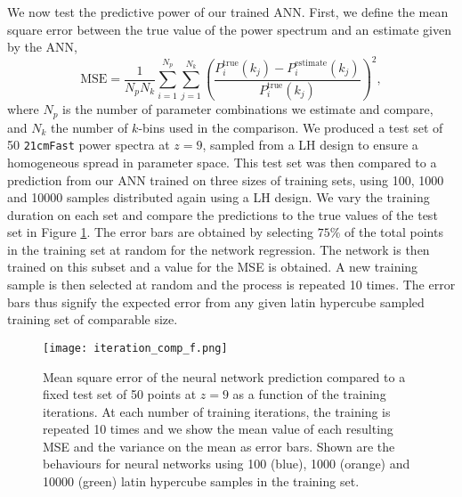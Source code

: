 \documentclass[useAMS,usenatbib]{mnras}
\begin{document}
We now test the predictive power of our trained ANN.
First, we define the mean square error between the true value of the power spectrum and an estimate given by the ANN,
\begin{equation}
\text{MSE} = \frac{1}{N_p N_k} \sum\limits_{i = 1}^{N_p}\sum\limits_{j = 1}^{N_k} \left(\frac{P^\text{true}_i(k_j) - P^\text{estimate}_i(k_j)}{P^\text{true}_i(k_j)}\right)^2,
\end{equation}
where $N_p$ is the number of parameter combinations we estimate and compare, and $N_k$ the number of $k$-bins used in the comparison.
We produced a test set of 50 \texttt{21cmFast} power spectra at $z = 9$, sampled from a LH design to ensure a homogeneous spread in parameter space. 
This test set was then compared to a prediction from our ANN trained on three sizes of training sets, using 100, 1000 and 10000 samples distributed again using a LH design.
We vary the training duration on each set and compare the predictions to the true values of the test set in Figure \ref{fig: training iter vs loss}.
The error bars are obtained by selecting $75\%$ of the total points in the training set at random for the network regression. 
The network is then trained on this subset and a value for the MSE is obtained.
A new training sample is then selected at random and the process is repeated 10 times. 
The error bars thus signify the expected error from any given latin hypercube sampled training set of comparable size. 
\begin{figure}
\texttt{[image: iteration\_comp\_f.png]}
\caption{Mean square error of the neural network prediction compared to a fixed test set of 50 points at $z = 9$ as a function of the training iterations.
At each number of training iterations, the training is repeated 10 times and we show the mean value of each resulting MSE and the variance on the mean as error bars. 
Shown are the behaviours for neural networks using 100 (blue), 1000 (orange) and 10000 (green) latin hypercube samples in the training set.}
\label{fig: training iter vs loss}
\end{figure}
\end{document}
